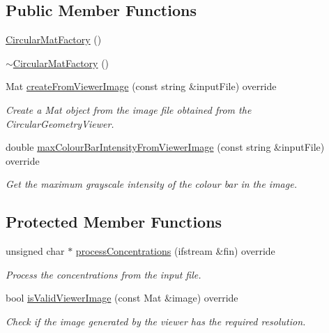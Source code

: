 \subsection*{\-Public \-Member \-Functions}
\begin{DoxyCompactItemize}
\item 
\hyperlink{classmultiscale_1_1analysis_1_1CircularMatFactory_a9b4523850ed5fbf84f27d10a93a48f80}{\-Circular\-Mat\-Factory} ()
\item 
\hyperlink{classmultiscale_1_1analysis_1_1CircularMatFactory_aaf49d7ad7e1955709929d180686e99d8}{$\sim$\-Circular\-Mat\-Factory} ()
\item 
\-Mat \hyperlink{classmultiscale_1_1analysis_1_1CircularMatFactory_a8d5fccf946065b982bfa700b9e47b1f5}{create\-From\-Viewer\-Image} (const string \&input\-File) override
\begin{DoxyCompactList}\small\item\em \-Create a \-Mat object from the image file obtained from the \-Circular\-Geometry\-Viewer. \end{DoxyCompactList}\item 
double \hyperlink{classmultiscale_1_1analysis_1_1CircularMatFactory_aea41720f6adfb983bb94ea0a45789874}{max\-Colour\-Bar\-Intensity\-From\-Viewer\-Image} (const string \&input\-File) override
\begin{DoxyCompactList}\small\item\em \-Get the maximum grayscale intensity of the colour bar in the image. \end{DoxyCompactList}\end{DoxyCompactItemize}
\subsection*{\-Protected \-Member \-Functions}
\begin{DoxyCompactItemize}
\item 
unsigned char $\ast$ \hyperlink{classmultiscale_1_1analysis_1_1CircularMatFactory_a8fe40d38b896f440e17b5514462d1e8a}{process\-Concentrations} (ifstream \&fin) override
\begin{DoxyCompactList}\small\item\em \-Process the concentrations from the input file. \end{DoxyCompactList}\item 
bool \hyperlink{classmultiscale_1_1analysis_1_1CircularMatFactory_a08e407b35a2d314c1aa17f21040ff23a}{is\-Valid\-Viewer\-Image} (const \-Mat \&image) override
\begin{DoxyCompactList}\small\item\em \-Check if the image generated by the viewer has the required resolution. \end{DoxyCompactList}\end{DoxyCompactItemize}
